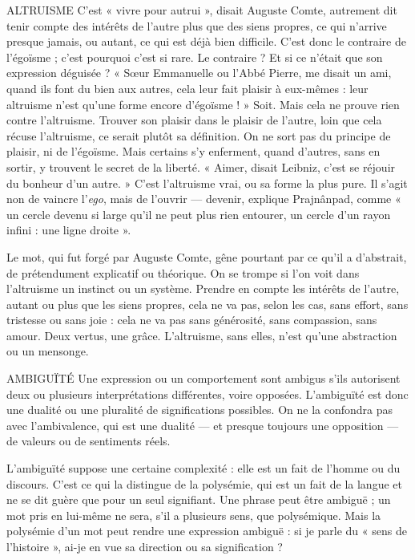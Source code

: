 ALTRUISME C'est « vivre pour autrui », disait Auguste Comte, autrement dit
tenir compte des intérêts de l’autre plus que des siens propres,
ce qui n’arrive presque jamais, ou autant, ce qui est déjà bien difficile. C’est
donc le contraire de l’égoïsme ; c’est pourquoi c’est si rare. Le contraire ? Et si
ce n’était que son expression déguisée ? « Sœur Emmanuelle ou l'Abbé Pierre,
me disait un ami, quand ils font du bien aux autres, cela leur fait plaisir à eux-mêmes :
leur altruisme n’est qu’une forme encore d’égoïsme ! » Soit. Mais cela
ne prouve rien contre l’altruisme. Trouver son plaisir dans le plaisir de l’autre,
loin que cela récuse l’altruisme, ce serait plutôt sa définition. On ne sort pas du
principe de plaisir, ni de l’égoïsme. Mais certains s'y enferment, quand
d’autres, sans en sortir, y trouvent le secret de la liberté. « Aimer, disait Leibniz,
c’est se réjouir du bonheur d’un autre. » C’est l’altruisme vrai, ou sa forme la
plus pure. Il s’agit non de vaincre l'{\it ego}, mais de l'ouvrir — devenir, explique Prajnânpad,
comme « un cercle devenu si large qu’il ne peut plus rien entourer, un
cercle d’un rayon infini : une ligne droite ».

Le mot, qui fut forgé par Auguste Comte, gêne pourtant par ce qu'il a
d’abstrait, de prétendument explicatif ou théorique. On se trompe si l'on voit
dans l’altruisme un instinct ou un système. Prendre en compte les intérêts de
l’autre, autant ou plus que les siens propres, cela ne va pas, selon les cas, sans
effort, sans tristesse ou sans joie : cela ne va pas sans générosité, sans compassion,
sans amour. Deux vertus, une grâce. L’altruisme, sans elles, n’est qu'une
abstraction ou un mensonge.

AMBIGUÏTÉ Une expression ou un comportement sont ambigus s’ils autorisent
deux ou plusieurs interprétations différentes, voire opposées.
L’ambiguïté est donc une dualité ou une pluralité de significations possibles.
On ne la confondra pas avec l’ambivalence, qui est une dualité — et
presque toujours une opposition — de valeurs ou de sentiments réels.

L’ambiguïté suppose une certaine complexité : elle est un fait de l’homme
ou du discours. C’est ce qui la distingue de la polysémie, qui est un fait de la
langue et ne se dit guère que pour un seul signifiant. Une phrase peut être
ambiguë ; un mot pris en lui-même ne sera, s’il a plusieurs sens, que polysémique.
Mais la polysémie d’un mot peut rendre une expression ambiguë : si je
parle du « sens de l’histoire », ai-je en vue sa direction ou sa signification ?

